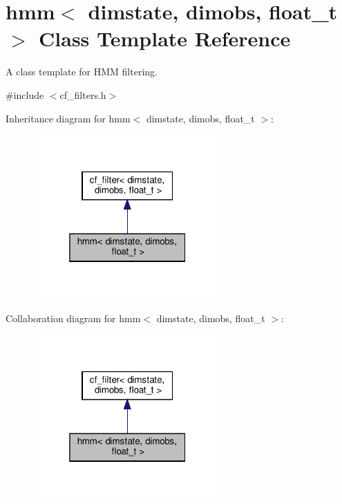 \hypertarget{classhmm}{}\section{hmm$<$ dimstate, dimobs, float\+\_\+t $>$ Class Template Reference}
\label{classhmm}


A class template for H\+MM filtering.  




{\ttfamily \#include $<$cf\+\_\+filters.\+h$>$}



Inheritance diagram for hmm$<$ dimstate, dimobs, float\+\_\+t $>$\+:\nopagebreak
\begin{figure}[H]
\begin{center}
\leavevmode
\includegraphics[width=205pt]{classhmm__inherit__graph}
\end{center}
\end{figure}


Collaboration diagram for hmm$<$ dimstate, dimobs, float\+\_\+t $>$\+:\nopagebreak
\begin{figure}[H]
\begin{center}
\leavevmode
\includegraphics[width=205pt]{classhmm__coll__graph}
\end{center}
\end{figure}
